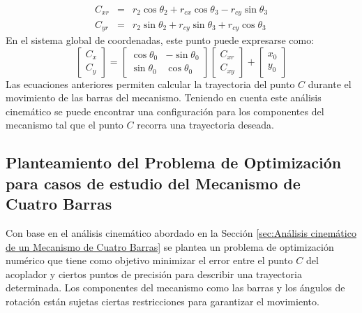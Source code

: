 \begin{eqnarray}
C_{xr}&=&r_2\cos{\theta_2} +r_{cx}\cos{\theta_3}-r_{cy}\sin{\theta_3} \label{eq:Cxr} \\
C_{yr}&=&r_2\sin{\theta_2} +r_{cy}\sin{\theta_3}+r_{cy}\cos{\theta_3}\label{eq:Cyr}
\end{eqnarray}
En el sistema global de coordenadas, este punto puede expresarse como:
\begin{equation}
 \begin{bmatrix}
  C_x\\
  C_y
\end{bmatrix}=
 \begin{bmatrix}
  \cos{\theta_0} & -\sin{\theta_0} \\
    \sin{\theta_0} & \cos{\theta_0} 
\end{bmatrix}
 \begin{bmatrix}
  C_{xr}\\
  C_{xy}
\end{bmatrix}+
 \begin{bmatrix}
  x_0\\
  y_0
\end{bmatrix}
 \end{equation}
Las ecuaciones anteriores permiten calcular la trayectoria del punto $C$ durante el movimiento de  las barras del mecanismo. Teniendo en cuenta este análisis cinemático se puede encontrar una configuración para los componentes del mecanismo tal que el punto $C$ recorra una trayectoria deseada. 

\subsection{Planteamiento del Problema de Optimización para casos de estudio del Mecanismo de Cuatro Barras}
Con base en el análisis cinemático abordado en la Sección \ref{sec:Análisis cinemático de un Mecanismo de Cuatro Barras} se plantea un problema de optimización numérico que tiene como objetivo minimizar el error entre el punto $C$ del acoplador y ciertos puntos de precisión para describir una trayectoria determinada. Los componentes del mecanismo como las  barras y los ángulos de rotación están sujetas ciertas restricciones para garantizar el movimiento. 

